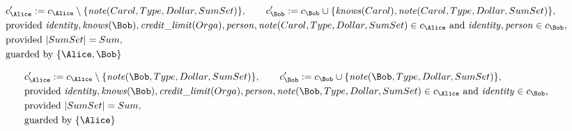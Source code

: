 \begin{align*}
&
c'_
{
\Alice
}
 := 
c_
{
\Alice
}
 \setminus 
\{
\mathit{\detokenize{
note
}}
(
Carol
,
Type
,
Dollar
,
SumSet
)
\}
, \qquad 
c'_
{
\Bob
}
 := 
c_
{
\Bob
}
 \cup 
\{
\mathit{\detokenize{
knows
}}
(
Carol
)
,
\mathit{\detokenize{
note
}}
(
Carol
,
Type
,
Dollar
,
SumSet
)
\}
,\\
&
\text{provided } 
\mathit{\detokenize{
identity
}}
,
\mathit{\detokenize{
knows
}}
(
\Bob
)
,
\mathit{\detokenize{
credit_limit
}}
(
Orga
)
,
\mathit{\detokenize{
person
}}
,
\mathit{\detokenize{
note
}}
(
Carol
,
Type
,
Dollar
,
SumSet
)
 \in c_
{
\Alice
}
 \text{ and } 
\mathit{\detokenize{
identity
}}
,
\mathit{\detokenize{
person
}}
 \in c_
{
\Bob
}
,\\
&
\text{provided } 
|
SumSet
|
=
Sum
,\\
&
\text{guarded by } \{
\Alice
,
\Bob
\}
\end{align*}

\begin{align*}
&
c'_
{
\Alice
}
 := 
c_
{
\Alice
}
 \setminus 
\{
\mathit{\detokenize{
note
}}
(
\Bob
,
Type
,
Dollar
,
SumSet
)
\}
, \qquad 
c'_
{
\Bob
}
 := 
c_
{
\Bob
}
 \cup 
\{
\mathit{\detokenize{
note
}}
(
\Bob
,
Type
,
Dollar
,
SumSet
)
\}
,\\
&
\text{provided } 
\mathit{\detokenize{
identity
}}
,
\mathit{\detokenize{
knows
}}
(
\Bob
)
,
\mathit{\detokenize{
credit_limit
}}
(
Orga
)
,
\mathit{\detokenize{
person
}}
,
\mathit{\detokenize{
note
}}
(
\Bob
,
Type
,
Dollar
,
SumSet
)
 \in c_
{
\Alice
}
 \text{ and } 
\mathit{\detokenize{
identity
}}
 \in c_
{
\Bob
}
,\\
&
\text{provided } 
|
SumSet
|
=
Sum
,\\
&
\text{guarded by } \{
\Alice
\}
\end{align*}

